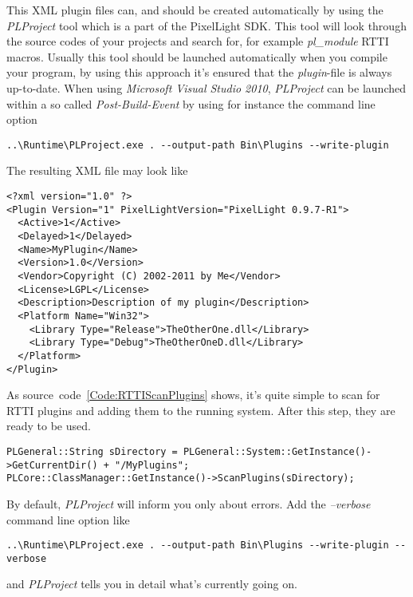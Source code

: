 This XML plugin files can, and should be created automatically by using the \emph{PLProject} tool which is a part of the PixelLight SDK. This tool will look through the source codes of your projects and search for, for example \emph{pl\_module} RTTI macros. Usually this tool should be launched automatically when you compile your program, by using this approach it's ensured that the \emph{plugin}-file is always up-to-date. When using \emph{Microsoft Visual Studio 2010}, \emph{PLProject} can be launched within a so called \emph{Post-Build-Event} by using for instance the command line option
\begin{verbatim}
..\Runtime\PLProject.exe . --output-path Bin\Plugins --write-plugin
\end{verbatim}
The resulting XML file may look like
\begin{verbatim}
<?xml version="1.0" ?>
<Plugin Version="1" PixelLightVersion="PixelLight 0.9.7-R1">
  <Active>1</Active>
  <Delayed>1</Delayed>
  <Name>MyPlugin</Name>
  <Version>1.0</Version>
  <Vendor>Copyright (C) 2002-2011 by Me</Vendor>
  <License>LGPL</License>
  <Description>Description of my plugin</Description>
  <Platform Name="Win32">
    <Library Type="Release">TheOtherOne.dll</Library>
    <Library Type="Debug">TheOtherOneD.dll</Library>
  </Platform>
</Plugin>
\end{verbatim}

As source~code~\ref{Code:RTTIScanPlugins} shows, it's quite simple to scan for RTTI plugins and adding them to the running system. After this step, they are ready to be used.
\begin{lstlisting}[float=htb,label=Code:RTTIScanPlugins,caption={Scanning for RTTI plugins to add}]
PLGeneral::String sDirectory = PLGeneral::System::GetInstance()->GetCurrentDir() + "/MyPlugins";
PLCore::ClassManager::GetInstance()->ScanPlugins(sDirectory);
\end{lstlisting}

By default, \emph{PLProject} will inform you only about errors. Add the \emph{--verbose} command line option like
\begin{verbatim}
..\Runtime\PLProject.exe . --output-path Bin\Plugins --write-plugin --verbose
\end{verbatim}
and \emph{PLProject} tells you in detail what's currently going on.



